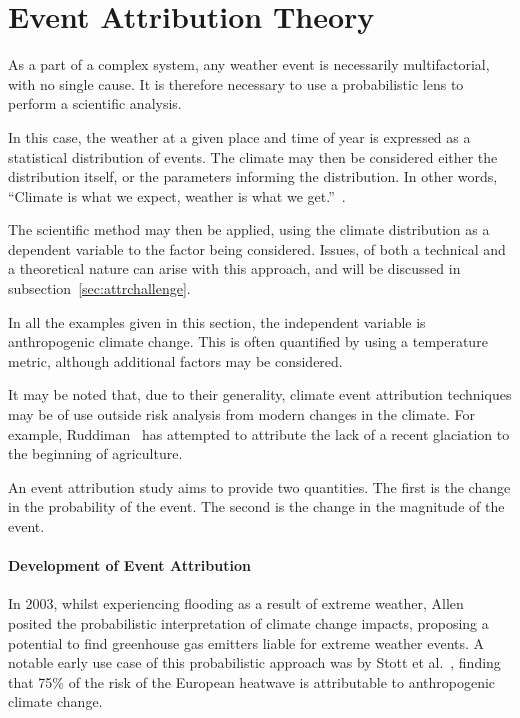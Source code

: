\documentclass[12pt,a4paper]{report}
\begin{document}
\chapter{Event Attribution Theory}\label{ch:attribution}

As a part of a complex system,
    any weather event is necessarily multifactorial,
    with no single cause.
It is therefore necessary to use a probabilistic lens to perform a scientific analysis.

In this case, the weather at a given place and time of year is expressed as a statistical distribution of events.
The climate may then be considered either the distribution itself,
    or the parameters informing the distribution.
In other words, ``Climate is what we expect, weather is what we get.''~\cite{Herbertson_1935}.

The scientific method may then be applied,
    using the climate distribution as a dependent variable to the factor being considered.
Issues, of both a technical and a theoretical nature can arise with this approach,
    and will be discussed in subsection~\ref{sec:attrchallenge}.

In all the examples given in this section,
    the independent variable is anthropogenic climate change.
This is often quantified by using a temperature metric,
    although additional factors may be considered.

It may be noted that,
    due to their generality,
    climate event attribution techniques may be of use outside risk analysis from modern changes in the climate.
For example,
    Ruddiman~\cite{Ruddiman_2010} has attempted to attribute the lack of a recent glaciation to the beginning of agriculture.

An event attribution study aims to provide two quantities.
The first is the change in the probability of the event.
The second is the change in the magnitude of the event.

\subsubsection{Development of Event Attribution}

In 2003, whilst experiencing flooding as a result of extreme weather,
    Allen~\cite{Allen_2003} posited the probabilistic interpretation of climate change impacts,
    proposing a potential to find greenhouse gas emitters liable for extreme weather events.
A notable early use case of this probabilistic approach was by Stott et al.~\cite{Stott_2004},
    finding that 75\% of the risk of the European heatwave is attributable to anthropogenic climate change.
\end{document}
